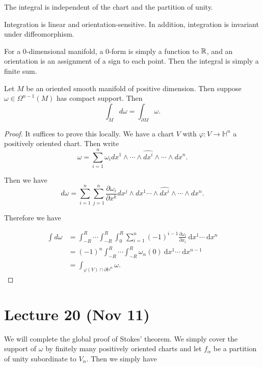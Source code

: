 \documentclass[twoside, 10pt]{article}
\renewcommand{\d}{\ \mathrm{d}}
\renewcommand{\H}{\mathbb{H}}
\begin{document}
    \begin{lem} The integral is independent of the chart and the partition of
    unity.  \end{lem}

    \begin{prop} Integration is linear and orientation-sensitive. In addition,
    integration is invariant under diffeomorphism.  \end{prop}

    For a $0$-dimensional manifold, a $0$-form is simply a function to $\mathbb{R}$,
    and an orientation is an assignment of a sign to each point. Then the
    integral is simply a finite sum.

    \begin{thm}[Stokes] Let $M$ be an oriented smooth manifold of positive
        dimension. Then suppose $\omega \in \Omega^{n-1}(M)$ has compact
        support. Then \[ \int_M d\omega = \int_{\partial M} \omega.\] \end{thm}

    \begin{proof} It suffices to prove this locally. We have a chart $V$ with
        $\varphi:V \to \H^n$ a positively oriented chart. Then write \[\omega =
        \sum_{i=1}^n \omega_i dx^1 \wedge \cdots \wedge \widehat{dx^i} \wedge
    \cdots \wedge dx^n.\]

        Then we have \[d\omega = \sum_{i=1}^n \sum_{j=1}^n \frac{\partial
        \omega_i}{\partial x^k} dx^j \wedge dx^1 \cdots \wedge \widehat{dx^i}
    \wedge \cdots \wedge dx^n.\]

        Therefore we have 

        \begin{align*} \int d \omega &= \int_{-R}^R \cdots \int_{-R}^R \int_0^R
            \sum_{i=1}^n (-1)^{i-1} \frac{\partial \omega_i}{\partial x_i} \d
            x^1 \cdots \d x^n \\ &= (-1)^n \int_{-R}^R \cdots \int_{-R}^R
            \omega_n(0) \d x^1 \cdots \d x^{n-1} \\ &= \int_{\varphi(V) \cap
        \partial \H^n} \omega.  \end{align*} \end{proof}

    \section{Lecture 20 (Nov 11)}%

    We will complete the global proof of Stokes' theorem. We simply cover the
    support of $\omega$ by finitely many positively oriented charts and let
    $f_{\alpha}$ be a partition of unity subordinate to $V_{\alpha}$. Then we
    simply have
\end{document}
